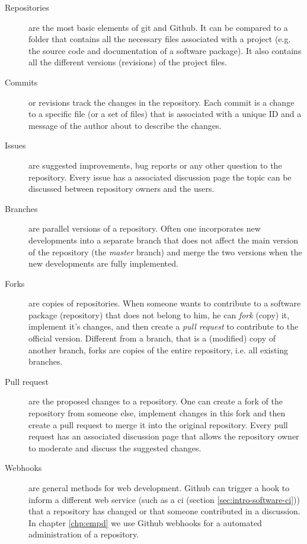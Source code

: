 \begin{refsection}
\begin{description}
	\item[Repositories] are the most basic elements of git and Github. It can be compared to a folder that contains all the necessary files associated with a project (e.g. the source code and documentation of a software package). It also contains all the different versions (revisions) of the project files.
	\item[Commits] or revisions track the changes in the repository. Each commit is a change to a specific file (or a set of files) that is associated with a unique ID and a message of the author about to describe the changes.
	\item[Issues] are suggested improvements, bug reports or any other question to the repository. Every issue has a associated discussion page the topic can be discussed between repository owners and the users.
	\item[Branches] are parallel versions of a repository. Often one incorporates new developments into a separate branch that does not affect the main version of the repository (the \textit{master} branch) and merge the two versions when the new developments are fully implemented.
	\item[Forks] are copies of repositories. When someone wants to contribute to a software package (repository) that does not belong to him, he can \textit{fork} (copy) it, implement it's changes, and then create a \textit{pull request} to contribute to the official version. Different from a branch, that is a (modified) copy of another branch, forks are copies of the entire repository, i.e. all existing branches.
	\item[Pull request] are the proposed changes to a repository. One can create a fork of the repository from someone else, implement changes in this fork and then create a pull request to merge it into the original repository. Every pull request has an associated discussion page that allows the repository owner to moderate and discuss the suggested changes.
	\item[Webhooks] are general methods for web development. Github can trigger a hook to inform a different web service (such as a \gls{ci} (section \ref{sec:intro-software-ci})) that a repository has changed or that someone contributed in a discussion. In chapter \ref{chp:empd} we use Github webhooks for a automated administration of a repository.
\end{description}



\end{refsection}
